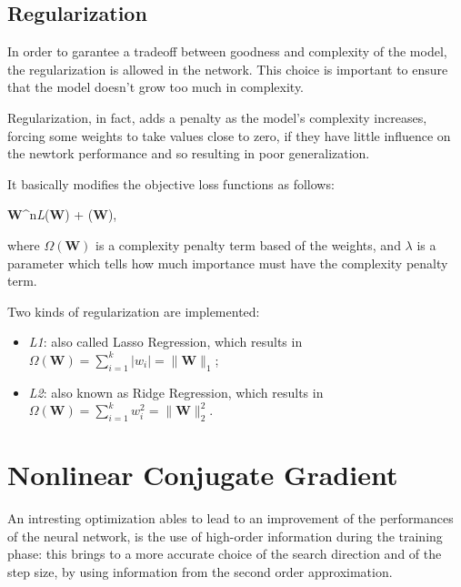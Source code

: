 		\subsection{Regularization}
		\label{sec:regularization}

			In order to garantee a tradeoff between goodness and complexity of the model, the regularization is allowed in the network. This choice is important to ensure that the model doesn't grow too much in complexity. 

			Regularization, in fact, adds a penalty as the model's complexity increases, forcing some weights to take values close to zero,  if they have little influence on the newtork performance and so resulting in poor generalization.

			It basically modifies the objective loss functions as follows:
			
			\begin{mini}
			  {\textbf{W}\in {}^n}{\textit{L}(\textbf{W}) + \lambda\Omega(\textbf{W}),}{}{}
			\end{mini}

			where $\Omega(\textbf{W})$ is a complexity penalty term based of the weights, and $\lambda$ is a parameter which tells how much importance must have the complexity penalty term.

			Two kinds of regularization are implemented:

			\begin{itemize}
				\item \textit{L1}: also called Lasso Regression, which results in $\Omega(\textbf{W}) = \sum_{i=1}^{k} |w_i| = \|\textbf{W}\|_1$;
				\item \textit{L2}: also known as Ridge Regression, which results in $\Omega(\textbf{W}) = \sum_{i=1}^{k}w_i^2 = \|\textbf{W}\|_2^2$.
			\end{itemize}




	\section{Nonlinear Conjugate Gradient} 
	\label{sec:nonlinear_conjugate_gradient}

		An intresting optimization ables to lead to an improvement of the performances of the neural network, is the use of high-order information during the training phase: this brings to a more accurate choice of the search direction and of the step size, by using information from the second order approximation.

